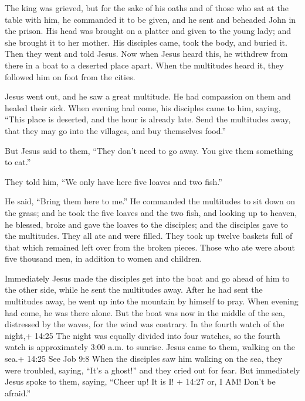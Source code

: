  The king was grieved, but for the sake of his oaths and of
those who sat at the table with him, he commanded it to be given,
 and he sent and beheaded John in the prison. 
His head was brought on a platter and given to the young lady; and she
brought it to her mother.  His disciples came, took the
body, and buried it. Then they went and told Jesus.  Now
when Jesus heard this, he withdrew from there in a boat to a deserted
place apart. When the multitudes heard it, they followed him on foot
from the cities.

 Jesus went out, and he saw a great multitude. He had
compassion on them and healed their sick.  When evening had
come, his disciples came to him, saying, ``This place is deserted, and
the hour is already late. Send the multitudes away, that they may go
into the villages, and buy themselves food.''

 But Jesus said to them, ``They don't need to go away. You
give them something to eat.''

 They told him, ``We only have here five loaves and two
fish.''

 He said, ``Bring them here to me.''  He
commanded the multitudes to sit down on the grass; and he took the five
loaves and the two fish, and looking up to heaven, he blessed, broke and
gave the loaves to the disciples; and the disciples gave to the
multitudes.  They all ate and were filled. They took up
twelve baskets full of that which remained left over from the broken
pieces.  Those who ate were about five thousand men, in
addition to women and children.

 Immediately Jesus made the disciples get into the boat and
go ahead of him to the other side, while he sent the multitudes away.
 After he had sent the multitudes away, he went up into the
mountain by himself to pray. When evening had come, he was there alone.
 But the boat was now in the middle of the sea, distressed
by the waves, for the wind was contrary.  In the fourth
watch of the night,+ 14:25 The night was equally divided into four
watches, so the fourth watch is approximately 3:00 a.m. to sunrise.
Jesus came to them, walking on the sea.+ 14:25 See Job 9:8 
When the disciples saw him walking on the sea, they were troubled,
saying, ``It's a ghost!'' and they cried out for fear.  But
immediately Jesus spoke to them, saying, ``Cheer up! It is I! + 14:27
or, I AM! Don't be afraid.''


